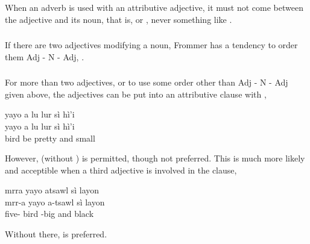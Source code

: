 \subsubsection{} When an adverb is used with an attributive adjective,
it must not come between the adjective and its noun, that is,
  or
, never something like .

\subsubsection{} If there are two adjectives modifying a noun, Frommer
has a tendency to order them Adj - N - Adj,  . 

\subsubsection{} For more than two adjectives, or to use some order
other than  Adj - N - Adj given above, the adjectives can be put
into an attributive clause with ,

\begin{interlin}
\glll yayo a lu lur sì hì'i \\
      yayo a lu lur sì hì'i \\
      bird  be pretty and small \\
 \Ipawl{}
\end{interlin}

\noindent However,  (without ) is permitted,
though not preferred.  This is much more likely and acceptible when a
third adjective is involved in the clause,

\begin{interlin}
\glll mrra yayo atsawl sì layon \\
      mrr-a yayo a-tsawl sì layon \\
      five- bird -big and black \\
 \Ipawl{}
\end{interlin}

\noindent Without  there,  is preferred. 

